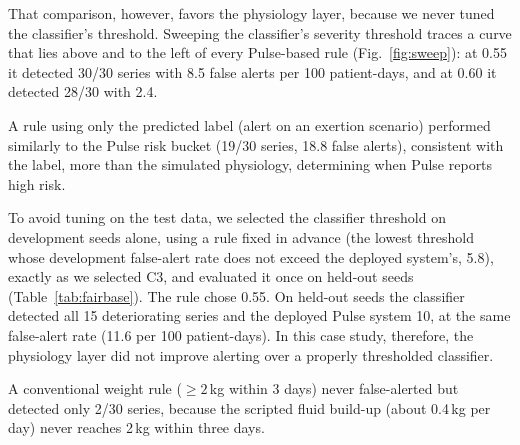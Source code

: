 \documentclass[conference]{IEEEtran}
\begin{document}
That comparison, however, favors the physiology layer, because we never tuned the classifier's threshold. Sweeping the classifier's severity threshold traces a curve that lies above and to the left of every Pulse-based rule (Fig.~\ref{fig:sweep}): at 0.55 it detected 30/30 series with 8.5 false alerts per 100 patient-days, and at 0.60 it detected 28/30 with 2.4.

A rule using only the predicted label (alert on an exertion scenario) performed similarly to the Pulse risk bucket (19/30 series, 18.8 false alerts), consistent with the label, more than the simulated physiology, determining when Pulse reports high risk.

To avoid tuning on the test data, we selected the classifier threshold on development seeds alone, using a rule fixed in advance (the lowest threshold whose development false-alert rate does not exceed the deployed system's, 5.8), exactly as we selected C3, and evaluated it once on held-out seeds (Table~\ref{tab:fairbase}). The rule chose 0.55. On held-out seeds the classifier detected all 15 deteriorating series and the deployed Pulse system 10, at the same false-alert rate (11.6 per 100 patient-days). In this case study, therefore, the physiology layer did not improve alerting over a properly thresholded classifier.

A conventional weight rule ($\geq2$\,kg within 3 days) never false-alerted but detected only 2/30 series, because the scripted fluid build-up (about 0.4\,kg per day) never reaches 2\,kg within three days.
\end{document}
